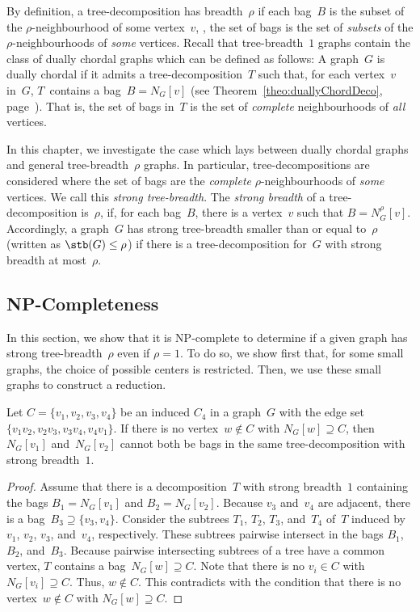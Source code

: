 
By definition, a tree-decomposition has breadth~$\rho$ if each bag~$B$ is the subset of the $\rho$-neighbourhood of some vertex~$v$, \ie, the set of bags is the set of \emph{subsets} of the $\rho$-neighbourhoods of \emph{some} vertices.
Recall that tree-breadth~$1$ graphs contain the class of dually chordal graphs which can be defined as follows:
A graph~$G$ is dually chordal if it admits a tree-decomposition~$T$ such that, for each vertex~$v$ in~$G$, $T$~contains a bag~$B = N_G[v]$ (see Theorem~\ref{theo:duallyChordDeco}, page~\pageref{theo:duallyChordDeco}).
That is, the set of bags in~$T$ is the set of \emph{complete} neighbourhoods of \emph{all} vertices.

In this chapter, we investigate the case which lays between dually chordal graphs and general tree-breadth~$\rho$ graphs.
In particular, tree-decompositions are considered where the set of bags are the \emph{complete} $\rho$-neighbourhoods of \emph{some} vertices.
We call this \emph{strong tree-breadth}.
The \emph{strong breadth} of a tree-decomposition is~$\rho$, if, for each bag~$B$, there is a vertex~$v$ such that $B = N_G^\rho[v]$.
Accordingly, a graph~$G$ has strong tree-breadth smaller than or equal to~$\rho$ (written as $\stb(G) \leq \rho$) if there is a tree-decomposition for~$G$ with strong breadth at most~$\rho$.


\subsection{NP-Completeness}

In this section, we show that it is NP-complete to determine if a given graph has strong tree-breadth~$\rho$ even if $\rho = 1$.
To do so, we show first that, for some small graphs, the choice of possible centers is restricted.
Then, we use these small graphs to construct a reduction.

\begin{lemma}
    \label{lem:C4AdjVert}
Let \( C = \{ v_1, v_2, v_3, v_4 \} \) be an induced \( C_4 \) in a graph~\( G \) with the edge set \( \{ v_1v_2, \allowbreak v_2v_3, \allowbreak v_3v_4, \allowbreak v_4v_1 \} \).
If there is no vertex~\( w \notin C \) with \( N_G[w] \supseteq C \), then \( N_G[v_1] \) and~\( N_G[v_2] \) cannot both be bags in the same tree-decomposition with strong breadth~\( 1 \).
\end{lemma}

\begin{proof}
Assume that there is a decomposition~$T$ with strong breadth~$1$ containing the bags $B_1 = N_G[v_1]$ and $B_2 = N_G[v_2]$.
Because $v_3$ and~$v_4$ are adjacent, there is a bag~$B_3 \supseteq \{ v_3, v_4 \}$.
Consider the subtrees $T_1$, $T_2$, $T_3$, and~$T_4$ of~$T$ induced by $v_1$, $v_2$, $v_3$, and~$v_4$, respectively.
These subtrees pairwise intersect in the bags $B_1$, $B_2$, and~$B_3$.
Because pairwise intersecting subtrees of a tree have a common vertex, $T$ contains a bag~$N_G[w] \supseteq C$.
Note that there is no $v_i \in C$ with $N_G[v_i] \supseteq C$.
Thus, $w \notin C$.
This contradicts with the condition that there is no vertex~$w \notin C$ with $N_G[w] \supseteq C$.
\end{proof}

